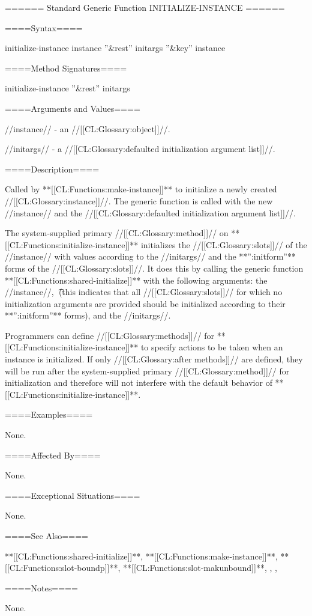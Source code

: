 ====== Standard Generic Function INITIALIZE-INSTANCE ======

====Syntax====


\DefgenWithValues initialize-instance {instance ''&rest'' initargs ''&key'' {\allowotherkeys}} {instance}


====Method Signatures====

\Defmeth initialize-instance { ''&rest'' initargs}

====Arguments and Values====

//instance// - an //[[CL:Glossary:object]]//.

//initargs// - a //[[CL:Glossary:defaulted initialization argument list]]//.

====Description====

Called by **[[CL:Functions:make-instance]]** to initialize a newly created //[[CL:Glossary:instance]]//. The generic function is called with the new //instance// and the //[[CL:Glossary:defaulted initialization argument list]]//.

The system-supplied primary //[[CL:Glossary:method]]// on **[[CL:Functions:initialize-instance]]** initializes the //[[CL:Glossary:slots]]// of the //instance// with values according to the //initargs// and the **'':initform''** forms of the //[[CL:Glossary:slots]]//. It does this by calling the generic function **[[CL:Functions:shared-initialize]]** with the following arguments: the //instance//, \t\ (this indicates that all //[[CL:Glossary:slots]]// for which no initialization arguments are provided should be initialized according to their **'':initform''** forms), and the //initargs//.

Programmers can define //[[CL:Glossary:methods]]// for **[[CL:Functions:initialize-instance]]** to specify actions to be taken when an instance is initialized. If only //[[CL:Glossary:after methods]]// are defined, they will be run after the system-supplied primary //[[CL:Glossary:method]]// for initialization and therefore will not interfere with the default behavior of **[[CL:Functions:initialize-instance]]**.

====Examples====

None.

====Affected By====

None.

====Exceptional Situations====

None.

====See Also====

**[[CL:Functions:shared-initialize]]**, **[[CL:Functions:make-instance]]**, **[[CL:Functions:slot-boundp]]**, **[[CL:Functions:slot-makunbound]]**, {\secref\ObjectCreationAndInit}, {\secref\InitargRules}, {\secref\DeclaringInitargValidity}

====Notes====

None.


